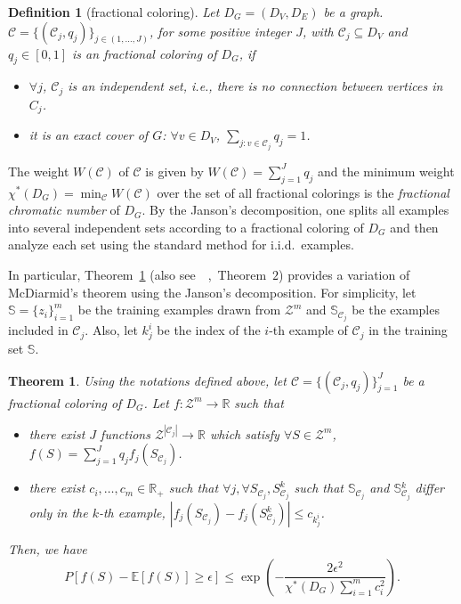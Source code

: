 \documentclass[letterpaper]{article} %
\newtheorem{theorem}{Theorem}
\newtheorem{definition}{Definition}
\newcommand{\E}{\mathbb{E}}
\newcommand{\Pro}{P}
\newcommand{\real}{\mathbb{R}}
\newcommand{\zspace}{\mathcal{Z}}
\newcommand{\fcoloring}{\chi^*}
\newcommand{\set}[1]{\{#1\}}
\newcommand{\trainingset}{\mathbb{S}}
\newcommand{\citep}[3]{(#1\ \citeauthor{#3}\ \citeyear{#3},\ #2)}
\begin{document}
\begin{definition}[fractional coloring]
  Let $D_G=(D_V,D_E)$ be a graph. $\mathcal{C}=\set{(\mathcal{C}_j,q_j)}_{j\in (1,\dots,J)}$, for some positive integer $J$, with $\mathcal{C}_j\subseteq D_V$ and $q_j\in [0,1]$ is an fractional coloring of $D_G$, if
  \begin{itemize}
    \item $\forall j$, $\mathcal{C}_j$ is an independent set, i.e., there is no connection between vertices in $C_j$.
    \item it is an exact cover of $G$: $\forall v \in D_V$, $\sum_{j: v\in \mathcal{C}_j} q_j = 1$.
  \end{itemize}
\end{definition}
The weight $W(\mathcal{C})$ of $\mathcal{C}$ is given by $W(\mathcal{C})=\sum_{j=1}^J q_j$ and the minimum weight $\fcoloring{}(D_G)=\min_{\mathcal{C}} W(\mathcal{C})$ over the set of all fractional colorings is the \emph{fractional chromatic number} of $D_G$.
By the Janson's decomposition, one splits all examples into several independent sets according to a fractional coloring of $D_G$ and then analyze each set using the standard method for i.i.d.\ examples.

In particular, Theorem~\ref{th:fractional_mcdiarmid} \citep{also see}{Theorem~$2$}{Usunier2005} provides a variation of McDiarmid's theorem using the Janson's decomposition.
For simplicity, let $\trainingset=\set{z_i}_{i=1}^{m}$ be the training examples drawn from $\zspace^m$ and $\trainingset{}_{\mathcal{C}_j}$ be the examples included in $\mathcal{C}_j$.
Also, let $k_j^i$ be the index of the $i$-th example of $\mathcal{C}_j$ in the training set $\trainingset{}$.

\begin{theorem}
   \label{th:fractional_mcdiarmid}
   Using the notations defined above, let $\mathcal{C} = \set{(\mathcal{C}_j, q_j)}_{j=1}^J$ be a fractional coloring of $D_G$. Let $f:\zspace^m \to \real{}$ such that
   \begin{itemize}
     \item there exist $J$ functions $\zspace^{|\mathcal{C}_j|} \to \real{}$ which satisfy $\forall S\in \zspace^m$, $f(S)=\sum_{j=1}^J q_j f_j(S_{\mathcal{C}_j})$.
     \item there exist $c_i,\dots,c_m\in \real{}_+$ such that $\forall j,\forall S_{\mathcal{C}_j}, S_{\mathcal{C}_j}^k$ such that $\trainingset{}_{\mathcal{C}_j}$ and $\trainingset{}_{\mathcal{C}_j}^k$ differ only in the $k$-th example, $|f_j(S_{\mathcal{C}_j}) - f_j(S_{\mathcal{C}_j}^k)|\le c_{k_j^i}$.
   \end{itemize}
     Then, we have
     \[\Pro[f(S)-\E[f(S)]\ge \epsilon] \le \exp\left(-\frac{2\epsilon^2}{\fcoloring{}(D_G)\sum_{i=1}^m c_i^2}\right).\]
 \end{theorem}
\end{document}
